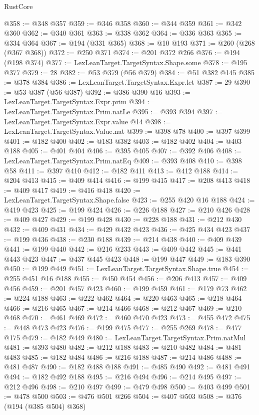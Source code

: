 \begin{lexlean}{RustCore}
\begin{coremodule}
@358 := @348 @357
@359 := @346 @358
@360 := @344 @359
@361 := @342 @360
@362 := @340 @361
@363 := @338 @362
@364 := @336 @363
@365 := @334 @364
@367 := @194 (@331 @365)
@368 := @10 @193
@371 := @260 (@268 (@367 @368))
@372 := @250 @371
@374 := @201 @372 @266
@376 := @194 (@198 @374)
@377 := LexLeanTarget.TargetSyntax.Shape.some
@378 := @195 @377
@379 := 28
@382 := @53 @379 (@56 @379)
@384 := @51 @382 @145
@385 := @378 @384
@386 := LexLeanTarget.TargetSyntax.Expr.let
@387 := 29
@390 := @53 @387 (@56 @387)
@392 := @386 @390 @16
@393 := LexLeanTarget.TargetSyntax.Expr.prim
@394 := LexLeanTarget.TargetSyntax.Prim.natLe
@395 := @393 @394
@397 := LexLeanTarget.TargetSyntax.Expr.value @14
@398 := LexLeanTarget.TargetSyntax.Value.nat
@399 := @398 @78
@400 := @397 @399
@401 := @182 @400
@402 := @183 @382
@403 := @182 @402
@404 := @403 @188
@405 := @401 @404
@406 := @395 @405
@407 := @392 @406
@408 := LexLeanTarget.TargetSyntax.Prim.natEq
@409 := @393 @408
@410 := @398 @58
@411 := @397 @410
@412 := @182 @411
@413 := @412 @188
@414 := @204 @413
@415 := @409 @414
@416 := @199 @415
@417 := @208 @413
@418 := @409 @417
@419 := @416 @418
@420 := LexLeanTarget.TargetSyntax.Shape.false
@423 := @255 @420 @16 @188
@424 := @419 @423
@425 := @199 @424
@426 := @226 @188
@427 := @210 @426
@428 := @409 @427
@429 := @199 @428
@430 := @228 @188
@431 := @212 @430
@432 := @409 @431
@434 := @429 @432 @423
@436 := @425 @434 @423
@437 := @199 @436
@438 := @230 @188
@439 := @214 @438
@440 := @409 @439
@441 := @199 @440
@442 := @216 @233
@443 := @409 @442
@445 := @441 @443 @423
@447 := @437 @445 @423
@448 := @199 @447
@449 := @183 @390
@450 := @199 @449
@451 := LexLeanTarget.TargetSyntax.Shape.true
@454 := @255 @451 @16 @188
@455 := @450 @454
@456 := @206 @413
@457 := @409 @456
@459 := @201 @457 @423
@460 := @199 @459
@461 := @179 @73
@462 := @224 @188
@463 := @222 @462
@464 := @220 @463
@465 := @218 @464
@466 := @216 @465
@467 := @214 @466
@468 := @212 @467
@469 := @210 @468
@470 := @461 @469
@472 := @460 @470 @423
@473 := @455 @472
@475 := @448 @473 @423
@476 := @199 @475
@477 := @255 @269
@478 := @477 @175
@479 := @182 @449
@480 := LexLeanTarget.TargetSyntax.Prim.natMul
@481 := @393 @480
@482 := @212 @188
@483 := @210 @482
@484 := @481 @483
@485 := @182 @484
@486 := @216 @188
@487 := @214 @486
@488 := @481 @487
@490 := @182 @488 @188
@491 := @485 @490
@492 := @481 @491
@494 := @182 @492 @188
@495 := @216 @494
@496 := @214 @495
@497 := @212 @496
@498 := @210 @497
@499 := @479 @498
@500 := @403 @499
@501 := @478 @500
@503 := @476 @501 @266
@504 := @407 @503
@508 := @376 (@194 (@385 @504) @368)

\end{coremodule}
\end{lexlean}
